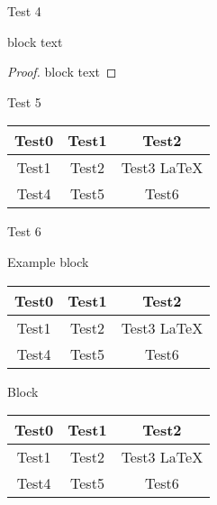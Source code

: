 \documentclass{beamer}
\begin{document}
        \begin{frame}{Test 4}
            \begin{theorem}
            block text
            \end{theorem}
            
            \begin{proof}
            block text
            \end{proof}

        \end{frame}


        \begin{frame}{Test 5}

            \begin{tabular}{|c|c|c|}
            \hline
            \textbf{Test0} & \textbf{Test1} & \textbf{Test2} \\
            \hline
            Test1 & Test2 & Test3 \LaTeX  \\
            \hline
            Test4 & Test5& Test6\\
            \hline
            \end{tabular}
            
        \end{frame}

        \begin{frame}{Test 6}

            \begin{exampleblock}{Example block}
                \smallskip 

                \begin{tabular}{|c|c|c|}
                \hline
                \textbf{Test0} & \textbf{Test1} & \textbf{Test2} \\
                \hline
                Test1 & Test2 & Test3 \LaTeX  \\
                \hline
                Test4 & Test5& Test6\\
                \hline
                \end{tabular}
            \end{exampleblock}

            \begin{block}{Block}
                \smallskip 

                \begin{tabular}{|c|c|c|}
                \hline
                \textbf{Test0} & \textbf{Test1} & \textbf{Test2} \\
                \hline
                Test1 & Test2 & Test3 \LaTeX  \\
                \hline
                Test4 & Test5& Test6\\
                \hline
                \end{tabular}
            \end{block}
        \end{frame}
\end{document}
